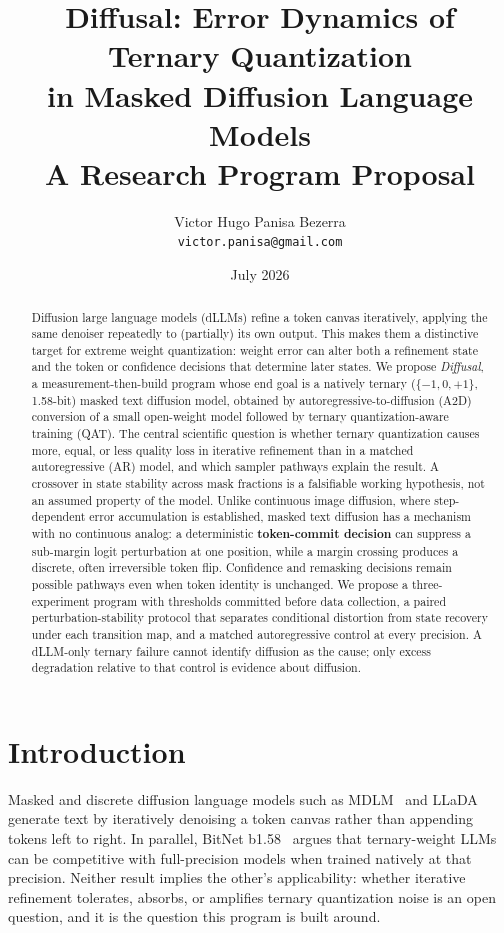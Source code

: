 \documentclass[11pt]{article}
\title{\textbf{Diffusal: Error Dynamics of Ternary Quantization\\in Masked Diffusion Language Models}\\[6pt]
\large A Research Program Proposal}
\author{Victor Hugo Panisa Bezerra\\\texttt{victor.panisa@gmail.com}}
\date{July 2026}
\begin{document}
\maketitle

\begin{abstract}
Diffusion large language models (dLLMs) refine a token canvas iteratively, applying the same denoiser repeatedly to (partially) its own output. This makes them a distinctive target for extreme weight quantization: weight error can alter both a refinement state and the token or confidence decisions that determine later states. We propose \emph{Diffusal}, a measurement-then-build program whose end goal is a natively ternary ($\{-1,0,+1\}$, 1.58-bit) masked text diffusion model, obtained by autoregressive-to-diffusion (A2D) conversion of a small open-weight model followed by ternary quantization-aware training (QAT). The central scientific question is whether ternary quantization causes more, equal, or less quality loss in iterative refinement than in a matched autoregressive (AR) model, and which sampler pathways explain the result. A crossover in state stability across mask fractions is a falsifiable working hypothesis, not an assumed property of the model. Unlike continuous image diffusion, where step-dependent error accumulation is established, masked text diffusion has a mechanism with no continuous analog: a deterministic \textbf{token-commit decision} can suppress a sub-margin logit perturbation at one position, while a margin crossing produces a discrete, often irreversible token flip. Confidence and remasking decisions remain possible pathways even when token identity is unchanged. We propose a three-experiment program with thresholds committed before data collection, a paired perturbation-stability protocol that separates conditional distortion from state recovery under each transition map, and a matched autoregressive control at every precision. A dLLM-only ternary failure cannot identify diffusion as the cause; only excess degradation relative to that control is evidence about diffusion.
\end{abstract}

\section{Introduction}

Masked and discrete diffusion language models such as MDLM~\cite{mdlm} and LLaDA~\cite{llada} generate text by iteratively denoising a token canvas rather than appending tokens left to right. In parallel, BitNet b1.58~\cite{bitnet} argues that ternary-weight LLMs can be competitive with full-precision models when trained natively at that precision. Neither result implies the other's applicability: whether iterative refinement tolerates, absorbs, or amplifies ternary quantization noise is an open question, and it is the question this program is built around.
\end{document}
